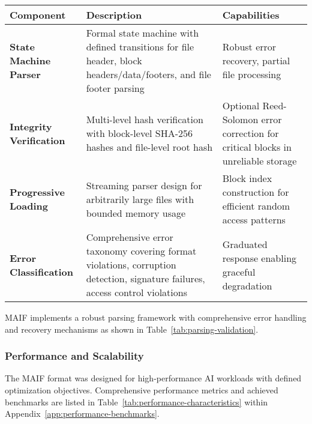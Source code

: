 \documentclass[conference]{IEEEtran}
\begin{document}
\begin{table*}[!t]
\renewcommand{\arraystretch}{1.3}
\caption{MAIF Parsing and Validation Framework Components}
\label{tab:parsing-validation}
\centering
\footnotesize
\begin{tabular}{p{3cm}p{6cm}p{5cm}}
\toprule
\textbf{Component} & \textbf{Description} & \textbf{Capabilities} \\
\midrule
\textbf{State Machine Parser} & Formal state machine with defined transitions for file header, block headers/data/footers, and file footer parsing & Robust error recovery, partial file processing \\
\textbf{Integrity Verification} & Multi-level hash verification with block-level SHA-256 hashes and file-level root hash & Optional Reed-Solomon error correction for critical blocks in unreliable storage \\
\textbf{Progressive Loading} & Streaming parser design for arbitrarily large files with bounded memory usage & Block index construction for efficient random access patterns \\
\textbf{Error Classification} & Comprehensive error taxonomy covering format violations, corruption detection, signature failures, access control violations & Graduated response enabling graceful degradation \\
\bottomrule
\end{tabular}
\end{table*}

MAIF implements a robust parsing framework with comprehensive error handling and recovery mechanisms as shown in Table~\ref{tab:parsing-validation}.

\subsubsection{Performance and Scalability}

The MAIF format was designed for high-performance AI workloads with defined optimization objectives. Comprehensive performance metrics and achieved benchmarks are listed in Table~\ref{tab:performance-characteristics} within Appendix~\ref{app:performance-benchmarks}.
\end{document}
